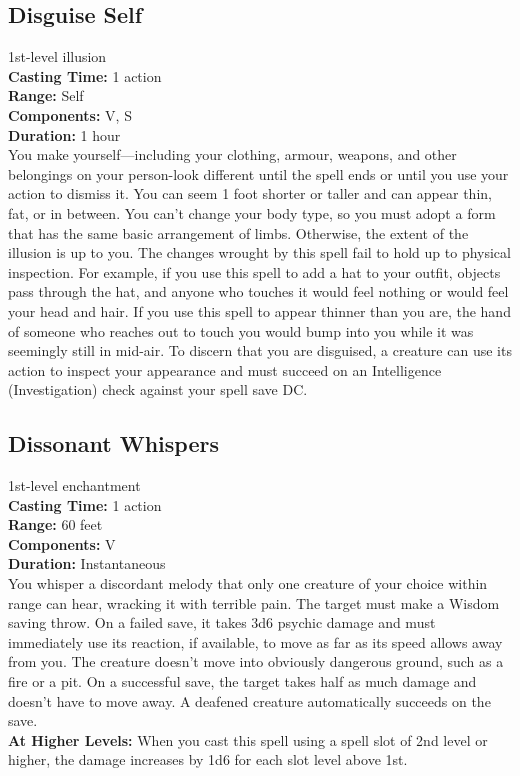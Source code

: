 \documentclass[11pt, A4paper, english]{article}
\begin{document}
		\subsection{Disguise Self}
1st-level illusion \\
\textbf{Casting Time:} 1 action \\
\textbf{Range:} Self \\
\textbf{Components:} V, S \\
\textbf{Duration:} 1 hour \\
You make yourself—including your clothing, armour, weapons, and other belongings on your person-look different until the spell ends or until you use your action to dismiss it. You can seem 1  foot shorter or taller and can appear thin, fat, or in between. You can’t change your body type, so you must adopt a form that has the same basic arrangement of limbs. Otherwise, the extent of the illusion is up to you. The changes wrought by this spell fail to hold up to physical inspection. For example, if you use this spell to add a hat to your outfit, objects pass through the hat, and anyone who touches it would feel nothing or would feel your head and hair. If you use this spell to appear thinner than you are, the hand of someone who reaches out to touch you would bump into you while it was seemingly still in mid-air. To discern that you are disguised, a creature can use its action to inspect your appearance and must succeed on an Intelligence (Investigation) check against your spell save DC.

		\subsection{Dissonant Whispers}
1st-level enchantment \\
\textbf{Casting Time:} 1 action \\
\textbf{Range:} 60 feet \\
\textbf{Components:} V \\
\textbf{Duration:} Instantaneous \\
You whisper a discordant melody that only one creature of your choice within range can hear, wracking it with terrible pain. The target must make a Wisdom saving throw. On a failed save, it takes 3d6 psychic damage and must immediately use its reaction, if available, to move as far as its speed allows away from you. The creature doesn’t move into obviously dangerous ground, such as a fire or a pit. On a successful save, the target takes half as much damage and doesn’t have to move away. A deafened creature automatically succeeds on the save. \\
\textbf{At Higher Levels:} When you cast this spell using a spell slot of 2nd level or higher, the damage increases by 1d6 for each slot level above 1st.
\end{document}

